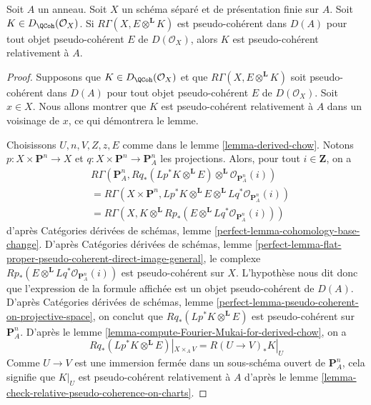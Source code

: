 \begin{lemma}
\label{lemma-characterize-pseudo-coherent}
Soit $A$ un anneau. Soit $X$ un schéma séparé et
de présentation finie sur $A$. Soit $K \in D_\QCoh(\mathcal{O}_X)$.
Si $R\Gamma(X, E \otimes^\mathbf{L} K)$ est pseudo-cohérent
dans $D(A)$ pour tout objet pseudo-cohérent $E$ de $D(\mathcal{O}_X)$,
alors $K$ est pseudo-cohérent relativement à $A$.
\end{lemma}

\begin{proof}
Supposons que $K \in D_\QCoh(\mathcal{O}_X)$ et que
$R\Gamma(X, E \otimes^\mathbf{L} K)$ soit pseudo-cohérent
dans $D(A)$ pour tout objet pseudo-cohérent $E$ de $D(\mathcal{O}_X)$.
Soit $x \in X$. Nous allons montrer que $K$ est pseudo-cohérent relativement à $A$
dans un voisinage de $x$, ce qui démontrera le lemme.

\medskip\noindent
Choisissons $U, n, V, Z, z, E$ comme dans le lemme \ref{lemma-derived-chow}.
Notons $p : X \times \mathbf{P}^n \to X$ et
$q : X \times \mathbf{P}^n \to \mathbf{P}^n_A$
les projections.
Alors, pour tout $i \in \mathbf{Z}$, on a
\begin{align*}
& R\Gamma(\mathbf{P}^n_A,
Rq_*(Lp^*K \otimes^\mathbf{L} E)
\otimes^\mathbf{L}
\mathcal{O}_{\mathbf{P}^n_A}(i)) \\
& =
R\Gamma(X \times \mathbf{P}^n,
Lp^*K \otimes^\mathbf{L} E \otimes^\mathbf{L}
Lq^*\mathcal{O}_{\mathbf{P}^n_A}(i)) \\
& =
R\Gamma(X,
K \otimes^\mathbf{L} Rp_*(E \otimes^\mathbf{L}
Lq^*\mathcal{O}_{\mathbf{P}^n_A}(i)))
\end{align*}
d'après
Catégories dérivées de schémas,
lemme \ref{perfect-lemma-cohomology-base-change}.
D'après
Catégories dérivées de schémas,
lemme \ref{perfect-lemma-flat-proper-pseudo-coherent-direct-image-general},
le complexe $Rp_*(E \otimes^\mathbf{L} Lq^*\mathcal{O}_{\mathbf{P}^n_A}(i))$
est pseudo-cohérent sur $X$. L'hypothèse nous dit donc que l'expression
de la formule affichée est un objet pseudo-cohérent de $D(A)$.
D'après
Catégories dérivées de schémas,
lemme \ref{perfect-lemma-pseudo-coherent-on-projective-space},
on conclut que $Rq_*(Lp^*K \otimes^\mathbf{L} E)$ est
pseudo-cohérent sur $\mathbf{P}^n_A$.
D'après le lemme \ref{lemma-compute-Fourier-Mukai-for-derived-chow},
on a
$$
Rq_*(Lp^*K \otimes^\mathbf{L} E)|_{X \times_A V} =
R(U \to V)_*K|_U
$$
Comme $U \to V$ est une immersion fermée dans un sous-schéma ouvert de
$\mathbf{P}^n_A$, cela signifie que $K|_U$ est pseudo-cohérent relativement à $A$
d'après le lemme \ref{lemma-check-relative-pseudo-coherence-on-charts}.
\end{proof}

